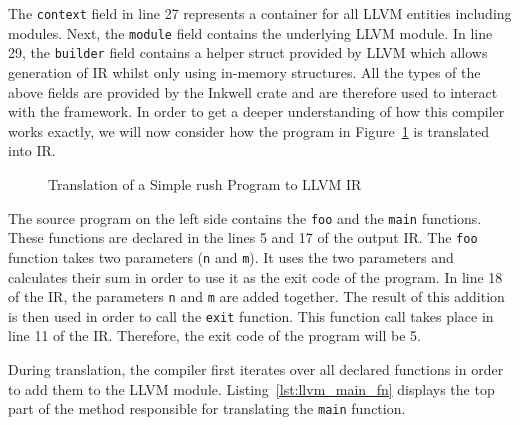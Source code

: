 The \texttt{context} field in line 27 represents a container for all LLVM entities including modules.
Next, the \texttt{module} field contains the underlying LLVM module.
In line 29, the \texttt{builder} field contains a helper struct provided by LLVM which allows generation of IR whilst only using in-memory structures.
All the types of the above fields are provided by the Inkwell crate and are therefore used to interact with the framework.
In order to get a deeper understanding of how this compiler works exactly, we will now consider how the program in Figure~\ref{fig:llvm_simple} is translated into IR.

\noindent
\begin{figure}[h]
	\begin{minipage}{.5\textwidth}
		\centering
	\end{minipage}%
	\begin{minipage}{.5\textwidth}
		\centering
	\end{minipage}
	\caption{Translation of a Simple rush Program to LLVM IR}
	\label{fig:llvm_simple}
\end{figure}

The source program on the left side contains the \texttt{foo} and the \texttt{main} functions.
These functions are declared in the lines 5 and 17 of the output IR.
The \texttt{foo} function takes two parameters (\texttt{n} and \texttt{m}).
It uses the two parameters and calculates their sum in order to use it as the exit code of the program.
In line 18 of the IR, the parameters \texttt{n} and \texttt{m} are added together.
The result of this addition is then used in order to call the \texttt{exit} function.
This function call takes place in line 11 of the IR.
Therefore, the exit code of the program will be 5.

During translation, the compiler first iterates over all declared functions in order to add them to the LLVM module.
Listing~\ref{lst:llvm_main_fn} displays the top part of the method responsible for translating the \texttt{main} function.


